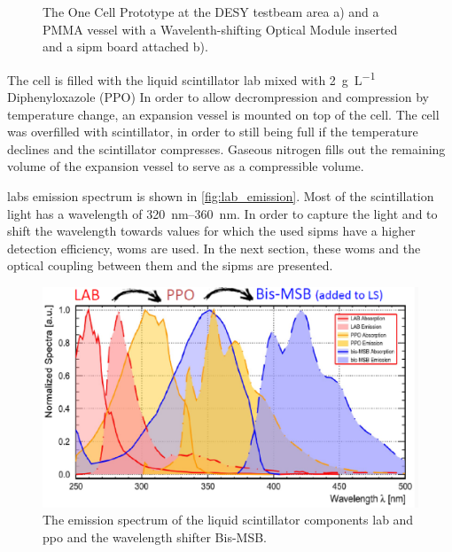 \begin{figure}
\begin{subfigure}[b]{.54\textwidth}
		\caption[PMMA vessel]{}
		\label{fig:pmma_vessel}
	\end{subfigure}
	\caption[One Cell Prototype and PMMA vessel]{The One Cell Prototype at the DESY testbeam area a) and a PMMA vessel with a Wavelenth-shifting Optical Module inserted and a \ac{sipm} board attached b). \cite{}}
	\label{fig:one_cell_and_pmma}
\end{figure}

The cell is filled with the liquid scintillator \ac{lab} mixed with \SI{2}{\gram\per\liter} Diphenyloxazole (PPO)%
In order to allow decrompression and compression by temperature change, an expansion vessel is mounted on top of the cell.
The cell was overfilled with scintillator, in order to still being full if the temperature declines and the scintillator compresses.
Gaseous nitrogen fills out the remaining volume of the expansion vessel to serve as a compressible volume. 

\ac{lab}s emission spectrum is shown in \autoref{fig:lab_emission}.
Most of the scintillation light has a wavelength of \SIrange{320}{360}{\nano\meter}.
In order to capture the light and to shift the wavelength towards values for which the used \acp{sipm} have a higher detection efficiency, \acp{wom} are used.
In the next section, these \acp{wom} and the optical coupling between them and the \acp{sipm} are presented.
\begin{figure}
	\centering
	\includegraphics[width=.8\textwidth]{pictures/lab_emission}
	\caption[LAB emission spectrum]{The emission spectrum of the liquid scintillator components \ac{lab} and \ac{ppo} and the wavelength shifter Bis-MSB. \cite{}}
	\label{fig:lab_emission}
\end{figure}



